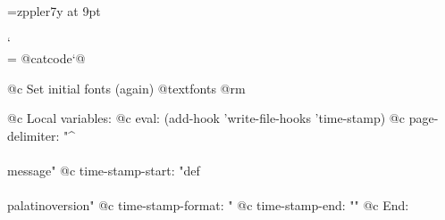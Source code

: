 \setfont\keyrm\rmfontprefix\rmshape{8pt}
\font\keysy=zppler7y at 9pt

\let\setfont=\setfontorig
\def\setfontorig{\relax}

\catcode`\\=\active
@catcode`@%

@c Set initial fonts (again)
@textfonts
@rm

@c Local variables:
@c eval: (add-hook 'write-file-hooks 'time-stamp)
@c page-delimiter: "^\\\\message"
@c time-stamp-start: "def\\\\palatinoversion{"
@c time-stamp-format: "%
@c time-stamp-end: "}"
@c End:

